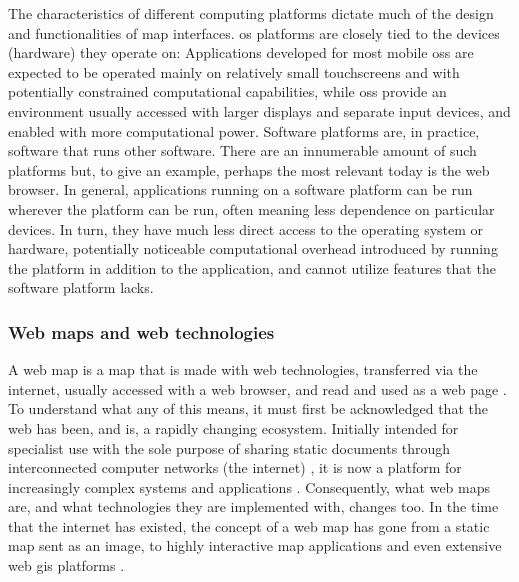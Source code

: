 The characteristics of different computing platforms
dictate much of the design and functionalities of map interfaces.
\acrshort{os} platforms are closely tied to
the devices (hardware) they operate on:
Applications developed for most mobile \acrshort{os}s
are expected to be operated mainly on relatively small touchscreens and
with potentially constrained computational capabilities,
while  \acrshort{os}s
provide an environment usually accessed with larger displays and
separate input devices, and enabled with more computational power.
Software platforms are, in practice, software that runs other software.
There are an innumerable amount of such platforms but,
to give an example, perhaps the most relevant today is the web browser.
In general, applications running on a software platform can be run wherever
the platform can be run, often meaning less dependence on particular devices.
In turn, they have much less direct access to the operating system or hardware,
potentially noticeable computational overhead introduced by running the platform
in addition to the application,
and cannot utilize features that the software platform lacks.



\subsubsection{Web maps and web technologies}

A web map is a map that is made with web technologies,
transferred via the internet,
usually accessed with a web browser,
and read and used as a web page \parencite{sac2017}.
To understand what any of this means,
it must first be acknowledged that
the web has been, and is, a rapidly changing ecosystem.
Initially intended for specialist use with the sole purpose of
sharing static documents through
interconnected computer networks (the internet) \parencite{ber1994},
it is now a platform for increasingly complex systems and applications
\parencite{mik2019}.
Consequently, what web maps are,
and what technologies they are implemented with, changes too.
In the time that the internet has existed,
the concept of a web map has gone
from a static map sent as an image, to
highly interactive map applications
and even extensive web \acrshort{gis} platforms \parencite{vee2017}.

